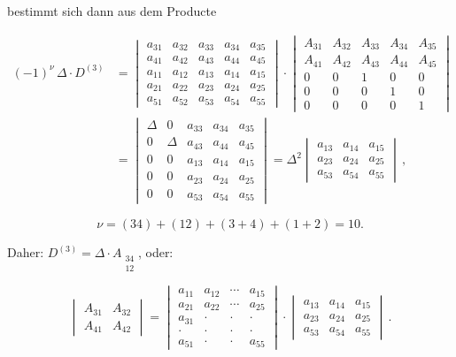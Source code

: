 bestimmt sich dann aus dem Producte

\begin{align*}
(-1)^{\nu}\, \Delta \cdot D^{(3)} &=
\begin{vmatrix}
a_{31} & a_{32} & a_{33} & a_{34} & a_{35} \\
a_{41} & a_{42} & a_{43} & a_{44} & a_{45} \\
a_{11} & a_{12} & a_{13} & a_{14} & a_{15} \\
a_{21} & a_{22} & a_{23} & a_{24} & a_{25} \\
a_{51} & a_{52} & a_{53} & a_{54} & a_{55}
\end{vmatrix}
\cdot
\begin{vmatrix}
A_{31} & A_{32} & A_{33} & A_{34} & A_{35} \\
A_{41} & A_{42} & A_{43} & A_{44} & A_{45} \\
0 & 0 & 1 & 0 & 0 \\
0 & 0 & 0 & 1 & 0 \\
0 & 0 & 0 & 0 & 1
\end{vmatrix} \\
&=
\begin{vmatrix}
\Delta & 0 & a_{33} & a_{34} & a_{35} \\
0 & \Delta & a_{43} & a_{44} & a_{45} \\
0 & 0 & a_{13} & a_{14} & a_{15} \\
0 & 0 & a_{23} & a_{24} & a_{25} \\
0 & 0 & a_{53} & a_{54} & a_{55}
\end{vmatrix}
=
\Delta^2
\begin{vmatrix}
a_{13} & a_{14} & a_{15} \\
a_{23} & a_{24} & a_{25} \\
a_{53} & a_{54} & a_{55}
\end{vmatrix}\, ,
\end{align*}

\[
\nu = (34) + (12) + (3+4) + (1+2) = 10. %
\]

Daher: $D^{(3)} = \Delta \cdot A_{\substack{34\\12}}$, oder:

\[
\begin{vmatrix}
A_{31} & A_{32} \\
A_{41} & A_{42}
\end{vmatrix}
=
\begin{vmatrix}
a_{11} & a_{12} & \cdots & a_{15} \\
a_{21} & a_{22} & \cdots & a_{25} \\
a_{31} & \cdot & \cdot & \cdot \\
\cdot & \cdot & \cdot & \cdot \\
a_{51} & \cdot & \cdot & a_{55}
\end{vmatrix}
\cdot
\begin{vmatrix}
a_{13} & a_{14} & a_{15} \\
a_{23} & a_{24} & a_{25} \\
a_{53} & a_{54} & a_{55}
\end{vmatrix}\, .
\]

